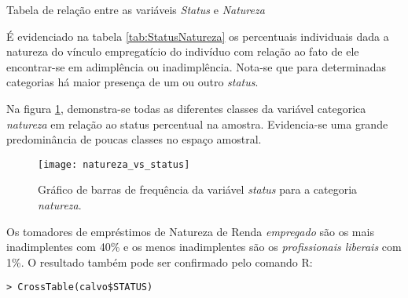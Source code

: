 \begin{table}[h]
\centering

\caption{\label{tab:StatusNatureza}Tabela de relação entre as variáveis \emph{Status
}e \emph{Natureza}}
\end{table}

É evidenciado na tabela \ref{tab:StatusNatureza} os percentuais individuais dada a natureza do vínculo empregatício
do indivíduo com relação ao fato de ele encontrar-se em adimplência ou inadimplência. Nota-se que para determinadas categorias 
há maior presença de um ou outro \emph{status}. 

Na figura \ref{fig:FreqStatusVsNatureza}, demonstra-se todas as diferentes classes da variável categorica \emph{natureza} em relação ao status percentual na amostra. Evidencia-se uma grande predominância de poucas classes no espaço amostral.

\begin{center}
\begin{figure}
\begin{centering}
\texttt{[image: natureza\_vs\_status]}
\par\end{centering}

\caption{\label{fig:FreqStatusVsNatureza}Gráfico de barras de frequência da
  variável \emph{status} para a categoria \emph{natureza}.}
\end{figure}

\par\end{center}

Os tomadores de empréstimos de Natureza de Renda \emph{empregado} são os
mais inadimplentes com 40\% e os menos inadimplentes são os \emph{profissionais
liberais} com 1\%. O resultado também pode ser confirmado pelo comando
R:

\begin{verbatim}
> CrossTable(calvo$STATUS)
\end{verbatim}
